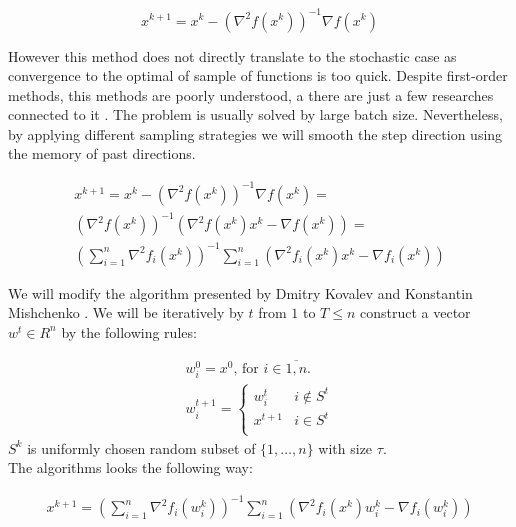 \documentclass{article}
\begin{document}
\begin{equation}
    x^{k+1} = x^k - \left(\nabla^2f\left(x^k\right)\right)^{-1}\nabla f\left(x^k\right)
\end{equation}


However this method does not directly translate to the stochastic case as convergence to the optimal of sample of functions is too quick. Despite first-order methods, this methods are poorly understood, a there are just a few researches connected to it \cite{litlink3}. The problem is usually solved by large batch size. Nevertheless, by applying different sampling strategies we will smooth the step direction using the memory of past directions.

\begin{equation}
\begin{multlined}
    x^{k+1} = x^k - \left(\nabla^2f\left(x^k\right)\right)^{-1}\nabla f\left(x^k\right) = \\
    \left(\nabla^2f\left(x^k\right)\right)^{-1}\left(\nabla^2f\left(x^k\right)x^k - \nabla f\left(x^k\right)\right) = \\
    \left(\sum\limits_{i=1}^n\nabla^2f_i\left(x^k\right)\right)^{-1}\sum\limits_{i=1}^n \left(\nabla^2f_i\left(x^k\right)x^k - \nabla f_i\left(x^k\right)\right)
\end{multlined}
\end{equation}

We will modify the algorithm presented by Dmitry Kovalev and Konstantin Mishchenko \cite{litlink4}. We will be iteratively by $t$ from $1$ to $T \leq n$ construct a vector $w^t \in R^n$ by the following rules: 

\begin{equation*}
\begin{multlined}
w^0_i = x^0 \text{, for } i \in \overline{1, n}. \\
w_i^{t+1}= 
 \begin{cases}
   w_i^{t} &i \not\in S^t\\
   x^{t + 1} &i \in S^t\\
 \end{cases}
 \end{multlined}
\end{equation*}
$S^k$ is uniformly chosen random subset of $\{1, \dots, n\}$ with size $\tau$. \\

The algorithms looks the following way:

\begin{equation}
\begin{multlined}
    x^{k+1} = \left(\sum\limits_{i=1}^n\nabla^2f_i\left(w_i^k\right)\right)^{-1}\sum\limits_{i=1}^n \left(\nabla^2f_i\left(x^k\right)w_i^k - \nabla f_i\left(w_i^k\right)\right)
\end{multlined}
\end{equation}
\end{document}
